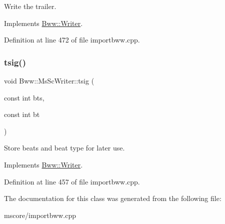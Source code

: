 Write the trailer. 

Implements \hyperlink{class_bww_1_1_writer}{Bww\+::\+Writer}.



Definition at line 472 of file importbww.\+cpp.

\mbox{\label{class_bww_1_1_ms_sc_writer_aa451ddaec741b6174bf43b0b11adf4de}} 
\subsubsection{\texorpdfstring{tsig()}{tsig()}}
{\footnotesize\ttfamily void Bww\+::\+Ms\+Sc\+Writer\+::tsig (\begin{DoxyParamCaption}\item[{const int}]{bts,  }\item[{const int}]{bt }\end{DoxyParamCaption})\hspace{0.3cm}{\ttfamily [virtual]}}

Store beats and beat type for later use. 

Implements \hyperlink{class_bww_1_1_writer}{Bww\+::\+Writer}.



Definition at line 457 of file importbww.\+cpp.



The documentation for this class was generated from the following file\+:\begin{DoxyCompactItemize}
\item 
mscore/importbww.\+cpp\end{DoxyCompactItemize}
